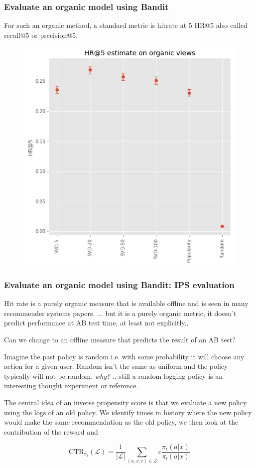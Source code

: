 \begin{frame}
  \frametitle{Evaluate an organic model using Bandit}

  For such an organic method, a standard metric is hitrate at 5 HR@5 also called recall@5 or precision@5.
\begin{figure}[h!]
\includegraphics[scale=0.4]{images/evalorganicwithbandit2.png}
\centering
\label{motex1}
\end{figure}
\end{frame}

\begin{frame}
  \frametitle{Evaluate an organic model using Bandit: IPS evaluation}

Hit rate is a purely organic measure that is available offline and is seen in many recommender systems papers.  \pause ... but it is a purely organic metric, it doesn't predict performance at AB test time, at least not explicitly..

\pause

Can we change to an offline measure that predicts the result of an AB test?

\pause

Imagine the past policy is random  i.e. with some probability it will choose any action for a given user.  \pause Random isn't the same as uniform and the policy typically will not be random. \pause \emph{why?} \pause .. still a random logging policy is an interesting thought experiment or reference.

The central idea of an inverse propensity score is that we evaluate a new policy using the logs of an old policy.  \pause We identify times in history where the new policy would make the same recommendation as the old policy, we then look at the contribution of the reward and 

\[
\text{CTR}_{\pi_t}(\mathcal{L}) = \frac{1}{|\mathcal{L}|}\sum_{(a,x,c) \in \mathcal {L}} c \frac{\pi_t(a|x)}{\pi_l(a|x)}
\]

\end{frame}


